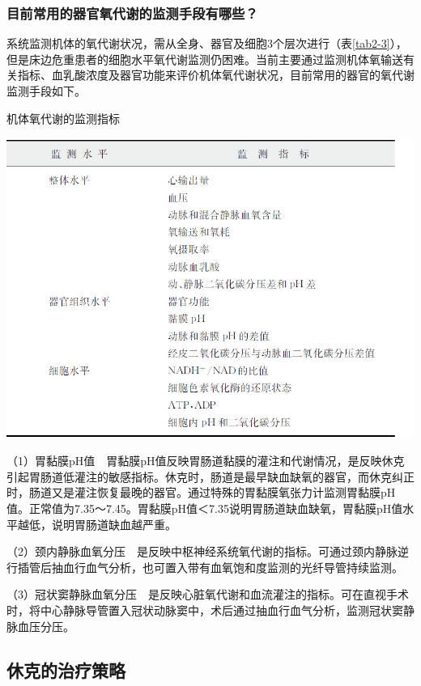 \subsubsection{目前常用的器官氧代谢的监测手段有哪些？}

系统监测机体的氧代谢状况，需从全身、器官及细胞3个层次进行（表\ref{tab2-3}），但是床边危重患者的细胞水平氧代谢监测仍困难。当前主要通过监测机体氧输送有关指标、血乳酸浓度及器官功能来评价机体氧代谢状况，目前常用的器官的氧代谢监测手段如下。

\begin{table}[htbp]
\centering
\caption{机体氧代谢的监测指标}
\label{tab2-3}
\includegraphics[width=\textwidth,height=\textheight,keepaspectratio]{./images/Image00019.jpg}
\end{table}

（1）胃黏膜pH值　胃黏膜pH值反映胃肠道黏膜的灌注和代谢情况，是反映休克引起胃肠道低灌注的敏感指标。休克时，肠道是最早缺血缺氧的器官，而休克纠正时，肠道又是灌注恢复最晚的器官。通过特殊的胃黏膜氧张力计监测胃黏膜pH值。正常值为7.35～7.45。胃黏膜pH值＜7.35说明胃肠道缺血缺氧，胃黏膜pH值水平越低，说明胃肠道缺血越严重。

（2）颈内静脉血氧分压　是反映中枢神经系统氧代谢的指标。可通过颈内静脉逆行插管后抽血行血气分析，也可置入带有血氧饱和度监测的光纤导管持续监测。

（3）冠状窦静脉血氧分压　是反映心脏氧代谢和血流灌注的指标。可在直视手术时，将中心静脉导管置入冠状动脉窦中，术后通过抽血行血气分析，监测冠状窦静脉血压分压。

\subsection{休克的治疗策略}

